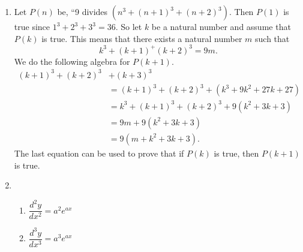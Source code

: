 \begin{enumerate}
\item Let $P(n)$ be, ``9 divides $\left( n^3 + (n + 1)^3 + (n + 2)^3 \right)$.  Then $P(1)$ is true since $1^3 + 2^3 + 3^3 = 36$.  So let $k$ be a natural number and assume that 
$P(k)$ is true.  This means that there exists a natural number $m$ such that
\[
k^3 + (k + 1)^ + (k + 2)^3 = 9m.
\]
We do the following algebra for $P(k + 1)$.
\begin{align*}
(k + 1)^3 + (k + 2)^3 &+ (k + 3)^3 \\
 &= (k + 1)^3 + (k + 2)^3 + \left(k^3 + 9k^2 + 27k + 27 \right) \\
          &= k^3 + (k + 1)^3 + (k + 2)^3 + 9\left( k^2 + 3k + 3 \right) \\
          &= 9m + 9\left( k^2 + 3k + 3 \right) \\
          &= 9 \left( m + k^2 + 3k + 3 \right).
\end{align*}
The last equation can be used to prove that if $P(k)$ is true, then $P(k + 1)$ is true.





\item %
\begin{enumerate}
\item $\dfrac{{d^2 y}}{{dx^2 }} = a^2 e^{ax}$

\item $\dfrac{{d^3 y}}{{dx^3 }} = a^3 e^{ax}$


\end{enumerate}
\end{enumerate}
